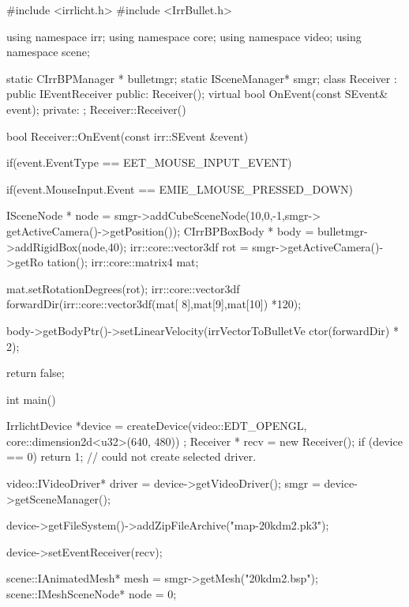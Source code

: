 \begin{DoxyCode}
#include <irrlicht.h>
#include <IrrBullet.h>

using namespace irr;
using namespace core;
using namespace video;
using namespace scene;


static CIrrBPManager * bulletmgr;
static ISceneManager* smgr;
class Receiver : public IEventReceiver
{
public:
                Receiver();
                virtual bool OnEvent(const SEvent& event);
private:
};
Receiver::Receiver()
{

}

bool Receiver::OnEvent(const irr::SEvent &event)
{

        if(event.EventType == EET_MOUSE_INPUT_EVENT)
        {
                if(event.MouseInput.Event == EMIE_LMOUSE_PRESSED_DOWN)
                {
                        ISceneNode * node = smgr->addCubeSceneNode(10,0,-1,smgr->
      getActiveCamera()->getPosition());
                        CIrrBPBoxBody * body = bulletmgr->addRigidBox(node,40);
                        irr::core::vector3df rot = smgr->getActiveCamera()->getRo
      tation();
                        irr::core::matrix4 mat;
        
                        mat.setRotationDegrees(rot);
                        irr::core::vector3df forwardDir(irr::core::vector3df(mat[
      8],mat[9],mat[10]) *120);

                        body->getBodyPtr()->setLinearVelocity(irrVectorToBulletVe
      ctor(forwardDir) * 2);
        
                }
                
        }

                                
        return false;
}
int main()
{

        

        IrrlichtDevice *device =
                createDevice(video::EDT_OPENGL, core::dimension2d<u32>(640, 480))
      ;
        Receiver * recv = new Receiver();
        if (device == 0)
                return 1; // could not create selected driver.
        
        video::IVideoDriver* driver = device->getVideoDriver();
         smgr = device->getSceneManager();

        device->getFileSystem()->addZipFileArchive("map-20kdm2.pk3");

        device->setEventReceiver(recv);

        scene::IAnimatedMesh* mesh = smgr->getMesh("20kdm2.bsp");
        scene::IMeshSceneNode* node = 0;

}
\end{DoxyCode}
